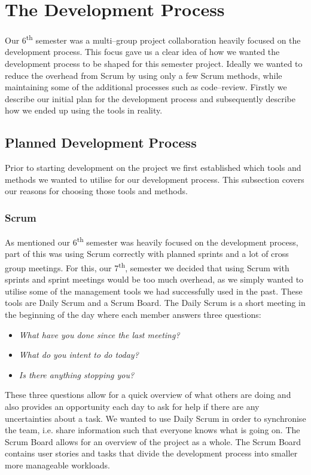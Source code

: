 \section{The Development Process}
Our 6\textsuperscript{th} semester was a multi--group project collaboration heavily focused on the development process.
This focus gave us a clear idea of how we wanted the development process to be shaped for this semester project.
Ideally we wanted to reduce the overhead from Scrum by using only a few Scrum methods, while maintaining some of the additional processes such as code--review.
Firstly we describe our initial plan for the development process and subsequently describe how we ended up using the tools in reality.
\subsection{Planned Development Process}
Prior to starting development on the project we first established which tools and methods we wanted to utilise for our development process.
This subsection covers our reasons for choosing those tools and methods.
\subsubsection{Scrum}
As mentioned our 6\textsuperscript{th} semester was heavily focused on the development process, part of this was using Scrum correctly with planned sprints and a lot of cross group meetings.
For this, our 7\textsuperscript{th}, semester we decided that using Scrum with sprints and sprint meetings would be too much overhead, as we simply wanted to utilise some of the management tools we had successfully used in the past.
These tools are Daily Scrum and a Scrum Board.
The Daily Scrum is a short meeting in the beginning of the day where each member answers three questions:
\begin{itemize}
    \item \textit{What have you done since the last meeting?}
    \item \textit{What do you intent to do today?}
    \item \textit{Is there anything stopping you?}
\end{itemize}
These three questions allow for a quick overview of what others are doing and also provides an opportunity each day to ask for help if there are any uncertainties about a task.
We wanted to use Daily Scrum in order to synchronise the team, i.e. share information such that everyone knows what is going on.
The Scrum Board allows for an overview of the project as a whole.
The Scrum Board contains user stories and tasks that divide the development process into smaller more manageable workloads.
